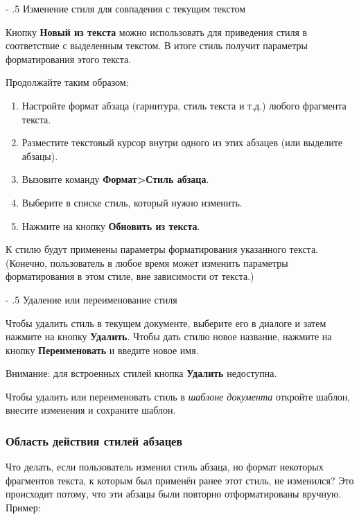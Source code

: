\documentclass[a4paper,10pt]{article}
\makeatletter
\renewcommand\paragraph{%
   \@startsection{paragraph}{4}{0mm}%
      {-\baselineskip}%
      {.5\baselineskip}%
      {\normalfont\normalsize\bfseries}}
\makeatother
\begin{document}
\paragraph{Изменение стиля для совпадения с текущим текстом}

Кнопку \textbf{Новый из текста} можно использовать для приведения стиля в соответствие с выделенным текстом. В итоге стиль получит параметры форматирования этого текста.

Продолжайте таким образом:
\begin{enumerate}
 \item Настройте формат абзаца (гарнитура, стиль текста и т.д.) любого фрагмента текста.
 \item Разместите текстовый курсор внутри одного из этих абзацев (или выделите абзацы).
 \item Вызовите команду \textbf{Формат>Стиль абзаца}.
 \item Выберите в списке стиль, который нужно изменить.
 \item Нажмите на кнопку \textbf{Обновить из текста}.
\end{enumerate}

К стилю будут применены параметры форматирования указанного текста. (Конечно, пользователь в любое время может изменить параметры форматирования в этом стиле, вне зависимости от текста.)

\paragraph{Удаление или переименование стиля}

Чтобы удалить стиль в текущем документе, выберите его в диалоге и затем нажмите на кнопку \textbf{Удалить}. Чтобы дать стилю новое название, нажмите на кнопку \textbf{Переименовать} и введите новое имя.

Внимание: для встроенных стилей кнопка \textbf{Удалить} недоступна.

Чтобы удалить или переименовать стиль в \textit{шаблоне документа} откройте шаблон, внесите изменения и сохраните шаблон.

\subsubsection{Область действия стилей абзацев}
Что делать, если пользователь изменил стиль абзаца, но формат некоторых фрагментов текста, к которым был применён ранее этот стиль, не изменился? Это происходит потому, что эти абзацы были повторно отформатированы вручную. Пример:
\end{document}
